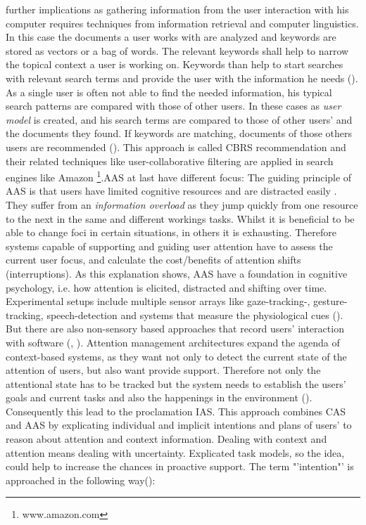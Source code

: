 further implications as gathering information from the user interaction with his computer requires techniques from information retrieval and computer linguistics. In this case the documents a user works with are analyzed and keywords are stored as vectors or a bag of words. The relevant keywords shall help to narrow the topical context a user is working on. Keywords than help to start searches with relevant search terms and provide the user with the information he needs (\cite{budzik2000user}).  As a single user is often not able to find the needed information, his typical search patterns are compared with those of other users. In these cases as \textit{user model} is created, and his search terms are compared to those of other users' and the documents they found. If keywords are matching, documents of those others users are recommended (\cite{anand2007contextual}). This approach is called \ac{CBRS} recommendation and their related techniques like user-collaborative filtering are applied in search engines like Amazon \footnote{www.amazon.com}.\ac{AAS} at last have different focus: The guiding principle of \acs{AAS} is that users have limited cognitive resources and are distracted easily . They suffer from an \textit{information overload} as they jump quickly from one resource to the next in the same and different workings tasks. Whilst it is beneficial to be able to change foci in certain situations, in others it is exhausting. Therefore systems capable of supporting and guiding user attention have to assess the current user focus, and calculate the cost/benefits of attention shifts (interruptions). As this explanation shows, \acs{AAS} have a foundation in cognitive psychology, i.e. how attention is elicited, distracted and shifting over time. Experimental setups include multiple sensor arrays like  gaze-tracking-, gesture-tracking, speech-detection and systems that measure the physiological cues (\cite{roda2006attention}). But there are also non-sensory based approaches that record users' interaction with software (\cite{horvitz2003models}, \cite{schmitz2011contextualized}). Attention management architectures expand the agenda of context-based systems, as they want not only to detect the current state of the attention of users, but also want provide support. Therefore not only the attentional state has to be tracked but the system needs to establish the users' goals and current tasks and also the happenings in the environment (\cite{roda2006attention}). Consequently this lead to the proclamation \ac{IAS}. This approach combines \acs{CAS} and \acs{AAS} by explicating individual and implicit intentions and plans of users' to reason about attention and context information. Dealing with context and attention means dealing with uncertainty. Explicated task models, so the idea, could help to increase the chances in proactive support. The term "'intention"' is  approached in the following way(\cite{cohen1990intention}):
